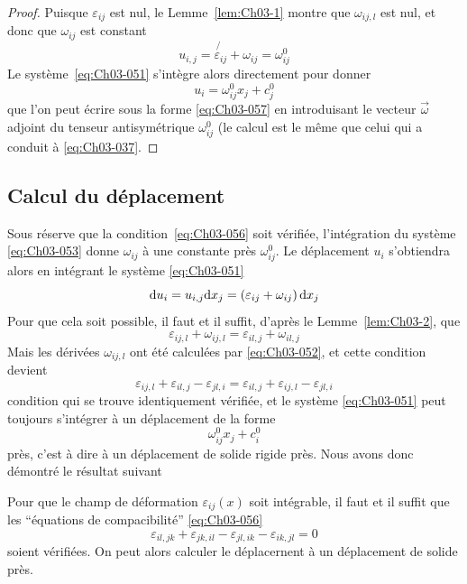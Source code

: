 \begin{proof}
    Puisque $\varepsilon_{ij}$ est nul, le Lemme~\ref{lem:Ch03-1} montre que $\omega_{ij,l}$ est nul, et donc que $\omega_{ij}$ est constant
    \begin{equation*}
        u_{i,j} = \not{\varepsilon_{ij}} + \omega_{ij} = \omega_{ij}^0
    \end{equation*}
    Le système~\eqref{eq:Ch03-051} s'intègre alors directement pour donner
    \begin{equation*}
        u_i = \omega_{ij}^0 x_j + c_{j}^0
    \end{equation*}
    que l'on peut écrire sous la forme \eqref{eq:Ch03-057} en introduisant le vecteur $\vec{\omega}$ adjoint du tenseur antisymétrique $\omega_{ij}^0$ (le calcul est le même que celui qui a conduit à \eqref{eq:Ch03-037}.
\end{proof}
\subsection{Calcul du déplacement}
Sous réserve que la condition~\eqref{eq:Ch03-056} soit vérifiée, l'intégration du système \eqref{eq:Ch03-053} donne $\omega_{ij}$ à une constante près $\omega_{ij}^0$.
Le déplacement $u_i$ s'obtiendra alors en intégrant le système \eqref{eq:Ch03-051}
\begin{equation*}
    \mathrm{d} u_i = u_{i,j} \mathrm{d} x_j = \left( \varepsilon_{ij} + \omega_{ij} \right) \mathrm{d} x_j
\end{equation*}
Pour que cela soit possible, il faut et il suffit, d'après le Lemme~\ref{lem:Ch03-2}, que
\begin{equation*}
    \varepsilon_{ij,l} + \omega_{ij,l} = \varepsilon_{il,j} + \omega_{il,j}
\end{equation*}
Mais les dérivées $\omega_{ij,l}$ ont été calculées par \eqref{eq:Ch03-052}, et cette condition devient 
\begin{equation*}
    \varepsilon_{ij,l} + \varepsilon_{il,j} - \varepsilon_{jl,i} = \varepsilon_{il,j} + \varepsilon_{ij,l} - \varepsilon_{jl,i}
\end{equation*}
condition qui se trouve identiquement vérifiée, et le système \eqref{eq:Ch03-051} peut toujours s'intégrer à un déplacement de la forme 
\begin{equation*}
    \omega_{ij}^0 x_j + c_i^0
\end{equation*}
près, c'est à dire à un déplacement de solide rigide près.
Nous avons donc démontré le résultat suivant
\begin{thm} \label{thm:Ch03-3}
    Pour que le champ de déformation $\varepsilon_{ij}(x)$ soit intégrable, il faut et il suffit que les ``équations de compacibilité'' \eqref{eq:Ch03-056}
    \begin{equation*}
        \varepsilon_{il,jk} + \varepsilon_{jk,il} - \varepsilon_{jl,ik} - \varepsilon_{ik,jl} = 0
    \end{equation*}
    soient vérifiées.
    On peut alors calculer le déplacernent à un déplacement de solide près.
\end{thm}

